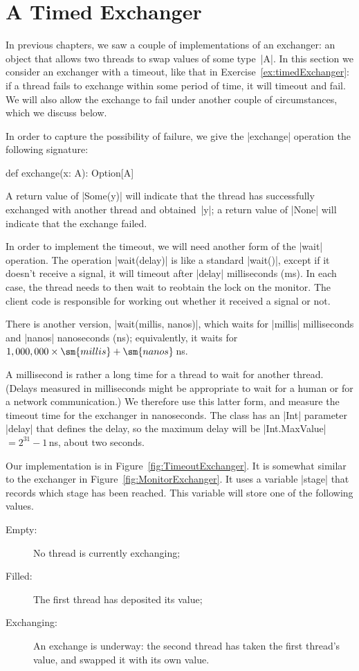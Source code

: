 
\section{A Timed Exchanger}
\label{sec:timed-exchanger}

In previous chapters, we saw a couple of implementations of an exchanger: an
object that allows two threads to swap values of some type~|A|.  In this
section we consider an exchanger with a timeout, like that in
Exercise~\ref{ex:timedExchanger}: if a thread fails to exchange within some
period of time, it will timeout and fail.  We will also allow the exchange to
fail under another couple of circumstances, which we discuss below.

In order to capture the possibility of failure, we give the |exchange|
operation the following signature:
%
\begin{scala}
  def exchange(x: A): Option[A]
\end{scala}
% 
A return value of |Some(y)| will indicate that the thread has successfully
exchanged with another thread and obtained~|y|; a return value of |None| will
indicate that the exchange failed. 

In order to implement the timeout, we will need another form of the |wait|
operation.  The operation |wait(delay)| is like a standard |wait()|, except if
it doesn't receive a signal, it will timeout after |delay| milliseconds (ms).
In each case, the thread needs to then wait to reobtain the lock on the
monitor.  The client code is responsible for working out whether it received a
signal or not.

There is another version, |wait(millis, nanos)|, which waits for |millis|
milliseconds and |nanos| nanoseconds (ns); equivalently, it waits for
$1,000,000 \times \sm{millis} + \sm{nanos}$\,ns.  

A millisecond is rather a long time for a thread to wait for another thread.
(Delays measured in milliseconds might be appropriate to wait for a human or
for a network communication.)  We therefore use this latter form, and measure
the timeout time for the exchanger in nanoseconds.  The class has an |Int|
parameter |delay| that defines the delay, so the maximum delay will be
|Int.MaxValue| $= 2^{31}-1$\,ns, about two seconds.

Our implementation is in Figure~\ref{fig:TimeoutExchanger}.  It is somewhat
similar to the exchanger in Figure~\ref{fig:MonitorExchanger}.  It uses a
variable |stage| that records which stage has been reached.  This variable
will store one of the following values.
%
\begin{description}
\item[{\scalastyle Empty}:] No thread is currently exchanging;

\item[{\scalashape Filled}:] The first thread has deposited its value;

\item[{\scalashape Exchanging}:] An exchange is underway: the second thread
  has taken the first thread's value, and swapped it with its own value.
\end{description}


